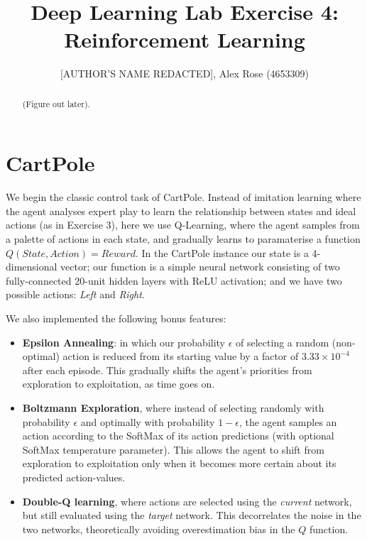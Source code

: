 \documentclass[a4paper, 11pt, conference]{ieeeconf}      %
\title{\LARGE \bf
Deep Learning Lab Exercise 4: Reinforcement Learning}
\author{[AUTHOR'S NAME REDACTED], Alex Rose (4653309)}
\begin{document}



\maketitle


\begin{abstract}

(Figure out later).

\end{abstract}



\section{CartPole}

We begin the classic control task of CartPole. Instead of imitation learning where the agent analyses expert play to learn the relationship between states and ideal actions (as in Exercise 3), here we use Q-Learning, where the agent samples from a palette of actions in each state, and gradually learns to paramaterise a function $Q(State, Action) = Reward$. In the CartPole instance our state is a 4-dimensional vector; our function is a simple neural network consisting of two fully-connected 20-unit hidden layers with ReLU activation; and we have two possible actions: \textit{Left} and \textit{Right}.

We also implemented the following bonus features:

\begin{itemize}
	\item \textbf{Epsilon Annealing}: in which our probability $\epsilon$ of selecting a random (non-optimal) action is reduced from its starting value by a factor of $3.33 \times 10^{-4}$ after each episode. This gradually shifts the agent's priorities from exploration to exploitation, as time goes on.

	\item \textbf{Boltzmann Exploration}, where instead of selecting randomly with probability $\epsilon$ and optimally with probability $1 - \epsilon$, the agent samples an action according to the SoftMax of its action predictions (with optional SoftMax temperature parameter). This allows the agent to shift from exploration to exploitation only when it becomes more certain about its predicted action-values.

	\item \textbf{Double-Q learning}, where actions are selected using the \textit{current} network, but still evaluated using the \textit{target} network. This decorrelates the noise in the two networks, theoretically avoiding overestimation bias in the $Q$ function.

\end{itemize}
\end{document}
